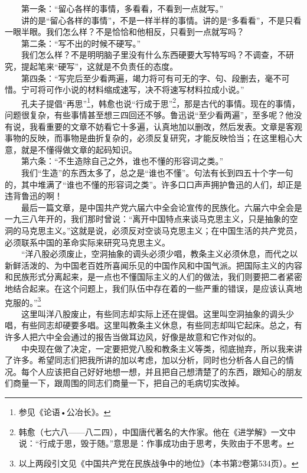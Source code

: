 \documentclass[cn,11pt,chinese]{elegantbook}
\begin{document}
　　第一条：“留心各样的事情，多看看，不看到一点就写。”\\
　　讲的是“留心各样的事情”，不是一样半样的事情。讲的是“多看看”，不是只看一眼半眼。我们怎么样？不是恰恰和他相反，只看到一点就写吗？\\
　　第二条：“写不出的时候不硬写。”\\
　　我们怎么样？不是明明脑子里没有什么东西硬要大写特写吗？不调查，不研究，提起笔来“硬写”，这就是不负责任的态度。\\
　　第四条：“写完后至少看两遍，竭力将可有可无的字、句、段删去，毫不可惜。宁可将可作小说的材料缩成速写，决不将速写材料拉成小说。”\\
　　孔夫子提倡“再思”\footnote[13]{ 参见《论语•公冶长》。}，韩愈也说“行成于思”\footnote[14]{ 韩愈（七六八——八二四），中国唐代著名的大作家。他在《进学解》一文中说：“行成于思，毁于随。”意思是：作事成功由于思考，失败由于不思考。}，那是古代的事情。现在的事情，问题很复杂，有些事情甚至想三四回还不够。鲁迅说“至少看两遍”，至多呢？他没有说，我看重要的文章不妨看它十多遍，认真地加以删改，然后发表。文章是客观事物的反映，而事物是曲折复杂的，必须反复研究，才能反映恰当；在这里粗心大意，就是不懂得做文章的起码知识。\\
　　第六条：“不生造除自己之外，谁也不懂的形容词之类。”\\
　　我们“生造”的东西太多了，总之是“谁也不懂”。句法有长到四五十个字一句的，其中堆满了“谁也不懂的形容词之类”。许多口口声声拥护鲁迅的人们，却正是违背鲁迅的啊！\\
　　最后一篇文章，是中国共产党六届六中全会论宣传的民族化。六届六中全会是一九三八年开的，我们那时曾说：“离开中国特点来谈马克思主义，只是抽象的空洞的马克思主义。”这就是说，必须反对空谈马克思主义；在中国生活的共产党员，必须联系中国的革命实际来研究马克思主义。\\
　　“洋八股必须废止，空洞抽象的调头必须少唱，教条主义必须休息，而代之以新鲜活泼的、为中国老百姓所喜闻乐见的中国作风和中国气派。把国际主义的内容和民族形式分离起来，是一点也不懂国际主义的人们的做法，我们则要把二者紧密地结合起来。在这个问题上，我们队伍中存在着的一些严重的错误，是应该认真地克服的。”\footnote[15]{ 以上两段引文见《中国共产党在民族战争中的地位》（本书第2卷第534页）。}\\
　　这里叫洋八股废止，有些同志却实际上还在提倡。这里叫空洞抽象的调头少唱，有些同志却硬要多唱。这里叫教条主义休息，有些同志却叫它起床。总之，有许多人把六中全会通过的报告当做耳边风，好像是故意和它作对似的。\\
　　中央现在做了决定，一定要把党八股和教条主义等类，彻底抛弃，所以我来讲了许多。希望同志们把我所讲的加以考虑，加以分析，同时也分析各人自己的情况。每个人应该把自己好好地想一想，并且把自己想清楚了的东西，跟知心的朋友们商量一下，跟周围的同志们商量一下，把自己的毛病切实改掉。\\
\end{document}
